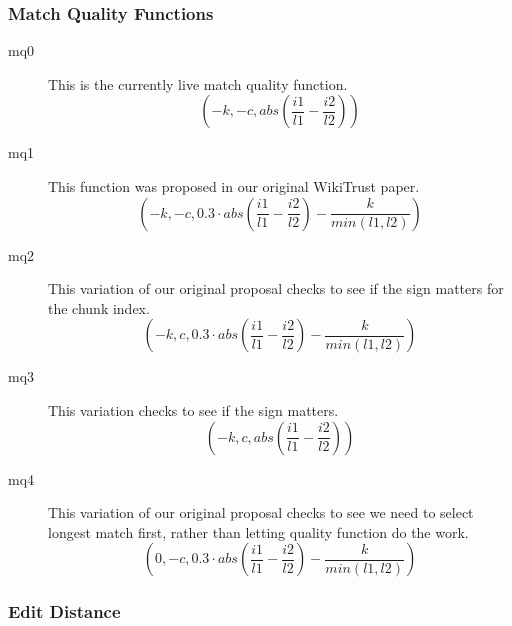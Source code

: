 \subsubsection{Match Quality Functions}

\begin{description}
\item[mq0] This is the currently live match quality function.
	\begin{equation}
	(-k, -c, abs(\frac{i1}{l1} - \frac{i2}{l2}))
	\end{equation}

\item[mq1] This function was proposed in our original WikiTrust paper.
\begin{equation}
(-k, -c, 0.3  \cdot abs(\frac{i1}{l1} - \frac{i2}{l2}) - \frac{k}{min(l1,l2)})
\end{equation}

\item[mq2] This variation of our original proposal checks to see if the
	sign matters for the chunk index.
\begin{equation}
(-k, c, 0.3  \cdot abs(\frac{i1}{l1} - \frac{i2}{l2}) - \frac{k}{min(l1,l2)})
\end{equation}

\item[mq3] This variation checks to see if the sign matters.
	\begin{equation}
	(-k, c, abs(\frac{i1}{l1} - \frac{i2}{l2}))
	\end{equation}

\item[mq4] This variation of our original proposal checks to see
	we need to select longest match first, rather than letting
	quality function do the work.
\begin{equation}
(0, -c, 0.3  \cdot abs(\frac{i1}{l1} - \frac{i2}{l2}) - \frac{k}{min(l1,l2)})
\end{equation}

\end{description}


\subsubsection{Edit Distance}

